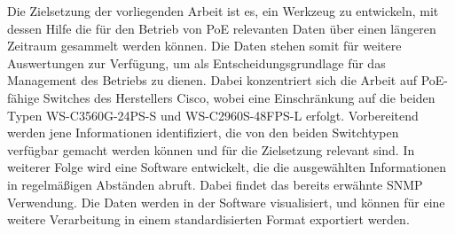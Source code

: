 Die Zielsetzung der vorliegenden Arbeit ist es, ein Werkzeug zu entwickeln, mit dessen Hilfe die für den Betrieb von PoE relevanten Daten über einen längeren Zeitraum gesammelt werden können. Die Daten stehen somit für weitere Auswertungen zur Verfügung, um als Entscheidungsgrundlage für das Management des Betriebs zu dienen. Dabei konzentriert sich die Arbeit auf PoE-fähige Switches des Herstellers Cisco, wobei eine Einschränkung auf die beiden Typen WS-C3560G-24PS-S und WS-C2960S-48FPS-L erfolgt. Vorbereitend werden jene Informationen identifiziert, die von den beiden Switchtypen verfügbar gemacht werden können und für die Zielsetzung relevant sind. In weiterer Folge wird eine Software entwickelt, die die ausgewählten Informationen in regelmäßigen Abständen abruft. Dabei findet das bereits erwähnte SNMP Verwendung. Die Daten werden in der Software visualisiert, und können für eine weitere Verarbeitung in einem standardisierten Format exportiert werden.
